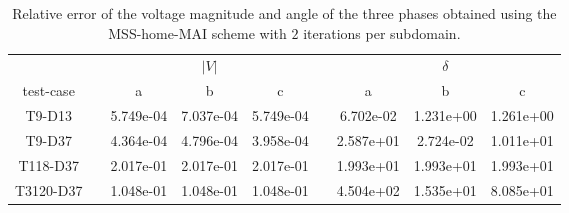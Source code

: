 \begin{table}
\renewcommand{\arraystretch}{1.3}
\centering
\label{}\hspace{2cm}\caption{Relative error of the voltage magnitude and angle of the three phases obtained using the MSS-home-MAI scheme with $2$ iterations per subdomain.  }
\begin{adjustbox}{width=1\textwidth} %
\small
\begin{tabular}{ccccccccc}
\toprule
{} && \multicolumn{3}{c}{$|V|$} && \multicolumn{3}{c}{$\delta$}  \\
\cmidrule{3-5}\cmidrule{7-9}
 test-case &&        a &        b &       c &&        a &       b &        c \\
\midrule
T9-D13       &&  5.749e-04 &  7.037e-04 &  5.749e-04 &&  6.702e-02 &  1.231e+00 &  1.261e+00 \\
T9-D37       &&  4.364e-04 &  4.796e-04 &  3.958e-04 &&  2.587e+01 &  2.724e-02 &  1.011e+01 \\
T118-D37     &&  2.017e-01 &  2.017e-01 &  2.017e-01 &&  1.993e+01 &  1.993e+01 &  1.993e+01 \\
T3120-D37    &&  1.048e-01 &  1.048e-01 &  1.048e-01 &&  4.504e+02 &  1.535e+01 &  8.085e+01 \\
\bottomrule
\end{tabular}
\end{adjustbox}
\end{table}
